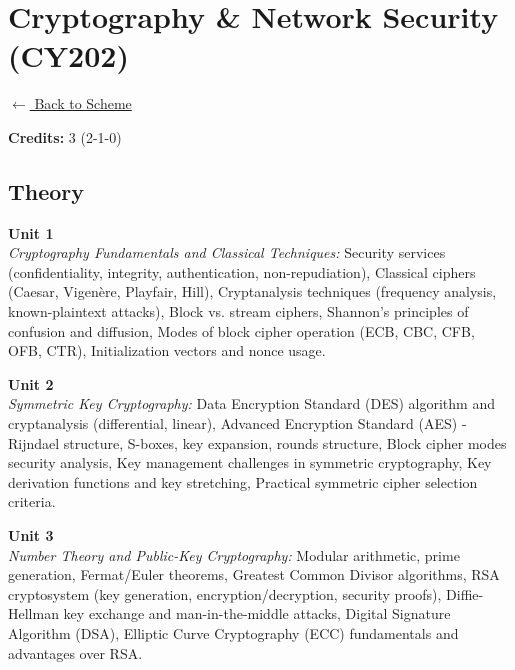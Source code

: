 \section*{Cryptography \& Network Security (CY202)}
\label{major:CS_2}

\noindent \small{\hyperref[main:scheme]{$\leftarrow$ Back to Scheme}} \vspace{0.5cm}

\noindent \textbf{Credits:} 3 (2-1-0)

\subsection*{Theory}
\noindent\textbf{Unit 1} \\
\textit{Cryptography Fundamentals and Classical Techniques:} Security services (confidentiality, integrity, authentication, non-repudiation), Classical ciphers (Caesar, Vigenère, Playfair, Hill), Cryptanalysis techniques (frequency analysis, known-plaintext attacks), Block vs. stream ciphers, Shannon's principles of confusion and diffusion, Modes of block cipher operation (ECB, CBC, CFB, OFB, CTR), Initialization vectors and nonce usage.

\vspace{0.3cm}

\noindent\textbf{Unit 2} \\
\textit{Symmetric Key Cryptography:} Data Encryption Standard (DES) algorithm and cryptanalysis (differential, linear), Advanced Encryption Standard (AES) - Rijndael structure, S-boxes, key expansion, rounds structure, Block cipher modes security analysis, Key management challenges in symmetric cryptography, Key derivation functions and key stretching, Practical symmetric cipher selection criteria.

\vspace{0.3cm}

\noindent\textbf{Unit 3} \\
\textit{Number Theory and Public-Key Cryptography:} Modular arithmetic, prime generation, Fermat/Euler theorems, Greatest Common Divisor algorithms, RSA cryptosystem (key generation, encryption/decryption, security proofs), Diffie-Hellman key exchange and man-in-the-middle attacks, Digital Signature Algorithm (DSA), Elliptic Curve Cryptography (ECC) fundamentals and advantages over RSA.

\vspace{0.3cm}

